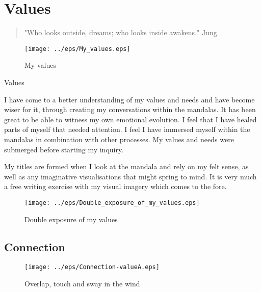 \chapter{Values}

\begin{quote}
"Who looks outside, dreams; who looks inside awakens." Jung 
\end{quote}
\newpage

\begin{figure}[!h]
\begin{center}
\texttt{[image: ../eps/My\_values.eps]} 
\caption{My values}
\label{label}
\end{center}
\end{figure}


Values

I have come to a better understanding of my values and needs and have become wiser for it, through creating my conversations within the mandalas. It has been great to be able to witness my own emotional evolution. I feel that I have healed parts of myself that needed attention. I feel I have immersed myself within the mandalas in combination with other processes. My values and needs were submerged before starting my inquiry. 

My titles are formed when I look at the mandala and rely on my felt sense, as well as any imaginative visualisations that might spring to mind. It is very much a free writing exercise with my visual imagery which comes to the fore.

\begin{figure}[!h]
\begin{center}
\texttt{[image: ../eps/Double\_exposure\_of\_my\_values.eps]} 
\caption{Double exposure of my values }
\label{label}
\end{center}
\end{figure}

\newpage
\section{Connection}

\begin{figure}[!h]
\begin{center}
\texttt{[image: ../eps/Connection-valueA.eps]} 
\caption{Overlap, touch and sway in the wind}
\label{connection}
\end{center}
\end{figure}

